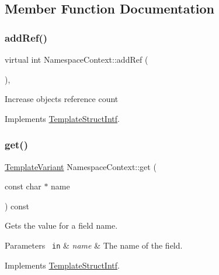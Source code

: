 \subsection{Member Function Documentation}
\mbox{\label{class_namespace_context_a796dffc7c1fbe50fc7aeb9c6fd072205}} 
\subsubsection{\texorpdfstring{addRef()}{addRef()}}
{\footnotesize\ttfamily virtual int Namespace\+Context\+::add\+Ref (\begin{DoxyParamCaption}{ }\end{DoxyParamCaption})\hspace{0.3cm}{\ttfamily [inline]}, {\ttfamily [virtual]}}

Increase object\textquotesingle{}s reference count 

Implements \mbox{\hyperlink{class_template_struct_intf_a05fe97ad47633beb326f69686faed581}{Template\+Struct\+Intf}}.

\mbox{\label{class_namespace_context_a0747424a5685c3adc549eb331be363c1}} 
\subsubsection{\texorpdfstring{get()}{get()}}
{\footnotesize\ttfamily \mbox{\hyperlink{class_template_variant}{Template\+Variant}} Namespace\+Context\+::get (\begin{DoxyParamCaption}\item[{const char $\ast$}]{name }\end{DoxyParamCaption}) const\hspace{0.3cm}{\ttfamily [virtual]}}

Gets the value for a field name. 
\begin{DoxyParams}[1]{Parameters}
\mbox{\texttt{ in}}  & {\em name} & The name of the field. \\
\hline
\end{DoxyParams}


Implements \mbox{\hyperlink{class_template_struct_intf_a3d610cb81b4adbb531ebed3aa3d09b51}{Template\+Struct\+Intf}}.


